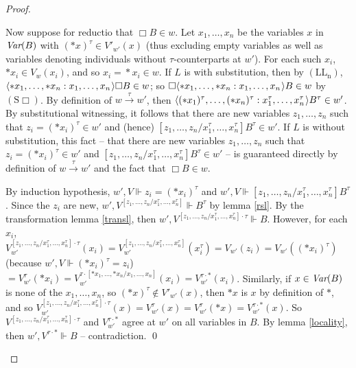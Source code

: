 \documentclass[11pt]{woarticle}
\theoremstyle{break}
\theoremstyle{nonumberplain}
\newcommand{\SAT}{\Vdash}
\newcommand{\1}{\;\,|\;\,}
\newcommand{\var}{\emph{Var}}
\renewcommand{\t}[1]{\ensuremath{\langle #1  \makebox[.2ex]{}\rangle}}
\newcommand{\T}[1]{\ensuremath{(\mathrm{ #1})}}
\begin{document}
\begin{proof}
\begin{enumerate}
    Now suppose for reductio that $\Box B \in w$. Let $x_1,\ldots,x_n$
    be the variables $x$ in $\var(B)$ with $(*x)^\tau \in V'_{w'}(x)$
    (thus excluding empty variables as well as variables denoting
    individuals without $\tau$-counterparts at $w'$). For each such $x_i$,
    $*x_i \in V_w(x_i)$, and so $x_i\!=\!*x_i \in w$. If $L$ is with
    substitution, then by \T{LL_n}, $\t{*x_1,\ldots,*x_n : x_1,\ldots,
      x_n}\Box B \in w$; so $\Box\t{*x_1,\ldots,*x_n : x_1,\ldots,
      x_n} B \in w$ by \T{S\Box}. By definition of
    $w\xrightarrow{\tau}w'$, then $\t{(*x_1)^\tau,\ldots,(*x_n)^\tau :
      x_1^\tau,\ldots, x_n^\tau} B^\tau \in w'$. By substitutional
    witnessing, it follows that there are new variables
    $z_1,\ldots,z_n$ such that $z_i\!=\!(*x_i)^\tau \in w'$ and
    (hence) $[z_1,\ldots,z_n / x_1^\tau,\ldots,x_n^\tau]B^\tau \in
    w'$. If $L$ is without substitution, this fact -- that there are
    new variables $z_1,\ldots,z_n$ such that $z_i\!=\!(*x_i)^\tau \in
    w'$ and $[z_1,\ldots,z_n / x_1^\tau,\ldots,x_n^\tau]B^\tau \in w'$
    -- is guaranteed directly by definition of $w\xrightarrow{\tau}w'$
    and the fact that $\Box B \in w$.

    By induction hypothesis, $w',V \SAT z_i\!=\!(*x_i)^\tau$ and $w',V
    \SAT [z_1,\ldots,z_n / x_1^\tau,\ldots,x_n^\tau]B^\tau$. Since the
    $z_i$ are new, $w',V^{[z_1,\ldots,z_n / x_1^\tau,\ldots,x_n^\tau]}
    \SAT B^\tau$ by lemma \ref{rsl}. By the transformation lemma
    \ref{transl}, then $w',V^{[z_1,\ldots,z_n /
      x_1^\tau,\ldots,x_n^\tau]\cdot\tau} \SAT B$. However, for each $x_i$,
    $V^{[z_1,\ldots,z_n /
      x_1^\tau,\ldots,x_n^\tau]\cdot\tau}_{w'}(x_i) =
    V^{[z_1,\ldots,z_n / x_1^\tau,\ldots,x_n^\tau]}_{w'}(x_i^\tau) =
    V_{w'}(z_i) = V_{w'}((*x_i)^\tau)$ (because $w',V \SAT
    (*x_i)^\tau\!=\!z_i$) $ = V_{w'}^\tau(*x_i) =
    V_{w'}^{\tau\cdot[*x_1,\ldots,*x_n/x_1,\ldots,x_n]}(x_i) =
    V_{w'}^{\tau\cdot *}(x_i)$. Similarly, if $x \in \var(B)$ is none
    of the $x_1,\ldots,x_n$, so $(*x)^\tau \not\in V'_{w'}(x)$, then
    $*x$ is $x$ by definition of $*$, and so $V^{[z_1,\ldots,z_n /
      x_1^\tau,\ldots,x_n^\tau]\cdot\tau}_{w'}(x) = V^\tau_{w'}(x) =
    V^\tau_{w'}(*x) = V_{w'}^{\tau\cdot *}(x)$. So $V^{[z_1,\ldots,z_n
      / x_1^\tau,\ldots,x_n^\tau]\cdot\tau}$ and $V_{w'}^{\tau\cdot
      *}$ agree at $w'$ on all variables in $B$. By lemma
    \ref{locality}, then $w',V^{\tau\cdot *} \SAT B$ -- contradiction.
    \qed

  \end{enumerate}

\end{proof}
\end{document}
